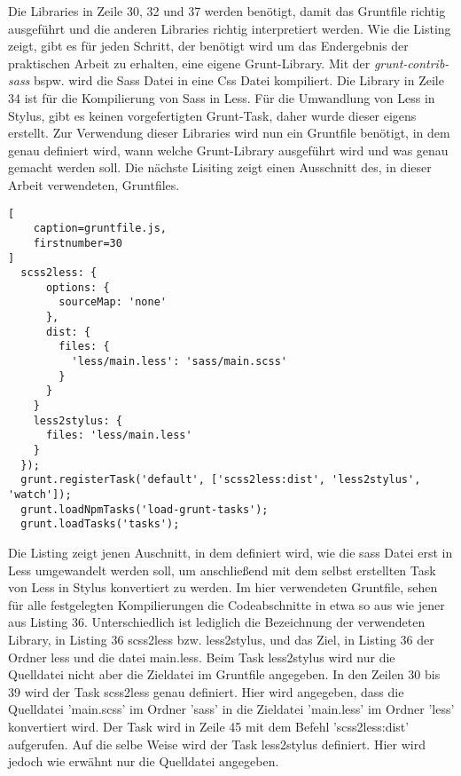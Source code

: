 Die Libraries in Zeile 30, 32 und 37 werden benötigt, damit das Gruntfile richtig ausgeführt und die anderen Libraries richtig interpretiert werden.
Wie die Listing zeigt, gibt es für jeden Schritt, der benötigt wird um das Endergebnis der praktischen Arbeit zu erhalten, eine eigene Grunt-Library. Mit der \textit{grunt-contrib-sass} bspw. wird die Sass Datei in eine Css Datei kompiliert. \newline
Die Library in Zeile 34 ist für die Kompilierung von Sass in Less. Für die Umwandlung von Less in Stylus, gibt es keinen vorgefertigten Grunt-Task, daher wurde dieser eigens erstellt.\newline
Zur Verwendung dieser Libraries wird nun ein Gruntfile benötigt, in dem genau definiert wird, wann welche Grunt-Library ausgeführt wird und was genau gemacht werden soll. Die nächste Lisiting zeigt einen Ausschnitt des, in dieser Arbeit verwendeten, Gruntfiles.
\begin{lstlisting}[
	caption=gruntfile.js,
	firstnumber=30
]
  scss2less: {
      options: {
        sourceMap: 'none'
      },
      dist: {
        files: {
          'less/main.less': 'sass/main.scss'
        }
      }
    }
    less2stylus: {
      files: 'less/main.less'
    }
  });
  grunt.registerTask('default', ['scss2less:dist', 'less2stylus', 'watch']);
  grunt.loadNpmTasks('load-grunt-tasks');
  grunt.loadTasks('tasks');
\end{lstlisting}
Die Listing zeigt jenen Auschnitt, in dem definiert wird, wie die sass Datei erst in Less umgewandelt werden soll, um anschließend mit dem selbst erstellten Task von Less in Stylus konvertiert zu werden.\newline
Im hier verwendeten Gruntfile, sehen für alle festgelegten Kompilierungen die Codeabschnitte in etwa so aus wie jener aus Listing 36. Unterschiedlich ist lediglich die Bezeichnung der verwendeten Library, in Listing 36 scss2less bzw. less2stylus, und das Ziel, in Listing 36 der Ordner less und die datei main.less.\newline
Beim Task less2stylus wird nur die Quelldatei nicht aber die Zieldatei im Gruntfile angegeben.\newline\newline
In den Zeilen 30 bis 39 wird der Task scss2less genau definiert. Hier wird angegeben, dass die Quelldatei 'main.scss' im Ordner 'sass' in die Zieldatei 'main.less' im Ordner 'less' konvertiert wird. Der Task wird in Zeile 45 mit dem Befehl 'scss2less:dist' aufgerufen.\newline
Auf die selbe Weise wird der Task less2stylus definiert. Hier wird jedoch wie erwähnt nur die Quelldatei angegeben.\newline\newline
